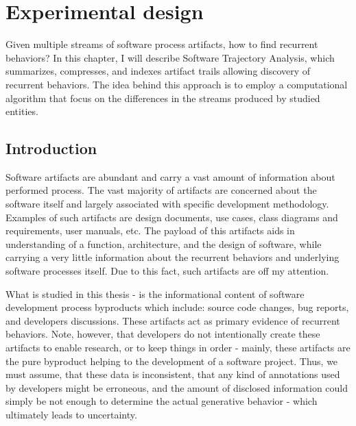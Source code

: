 \documentclass[12pt,oneside]{report}
\title{}
\author{Pavel Senin}
\numberwithin{equation}{subsection}
\begin{document}
\maketitle

\begin{abstract}

\end{abstract}

\chapter{Experimental design}
Given multiple streams of software process artifacts, how to find recurrent behaviors? In this chapter, 
I will describe Software Trajectory Analysis, which summarizes, compresses, and indexes artifact trails 
allowing discovery of recurrent behaviors. The idea behind this approach is to employ a computational 
algorithm that focus on the differences in the streams produced by studied entities.

\section{Introduction}
Software artifacts are abundant and carry a vast amount of information about performed process. 
The vast majority of artifacts are concerned about the software itself and largely associated with 
specific development methodology. Examples of such artifacts are design documents, use cases, class 
diagrams and requirements, user manuals, etc. The payload of this artifacts aids in understanding of 
a function, architecture, and the design of software, while carrying a very little information about the 
recurrent behaviors and underlying software processes itself. Due to this fact, such artifacts are off 
my attention.

What is studied in this thesis - is the informational content of software development process byproducts 
which include: source code changes, bug reports, and developers discussions. These artifacts act as primary 
evidence of recurrent behaviors. Note, however, that developers do not intentionally create these 
artifacts to enable research, or to keep things in order - mainly, these artifacts are the pure byproduct
helping to the development of a software project. Thus, we must assume, that these data is inconsistent, 
that any kind of annotations used by developers might be erroneous, and the amount of disclosed information 
could simply be not enough to determine the actual generative behavior - which ultimately leads to 
uncertainty.
\end{document}
